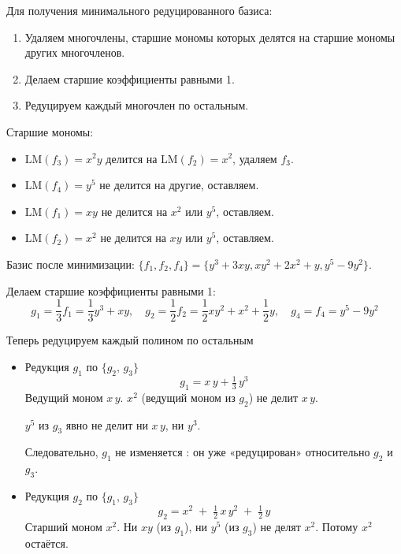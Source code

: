 \documentclass[a4paper]{article}
\begin{document}
\begin{enumerate}
  Для получения минимального редуцированного базиса:
  \begin{enumerate}
    \item Удаляем многочлены, старшие мономы которых делятся на старшие мономы других многочленов.
    \item Делаем старшие коэффициенты равными 1.
    \item Редуцируем каждый многочлен по остальным.
  \end{enumerate}

  
  Старшие мономы:
  \begin{itemize}
    \item $\text{LM}(f_3) = x^2y$ делится на $\text{LM}(f_2) = x^2$, удаляем $f_3$.
    \item $\text{LM}(f_4) = y^5$ не делится на другие, оставляем.
    \item $\text{LM}(f_1) = xy$ не делится на $x^2$ или $y^5$, оставляем.
    \item $\text{LM}(f_2) = x^2$ не делится на $xy$ или $y^5$, оставляем.
  \end{itemize}
  
  Базис после минимизации: \( \{f_1, f_2, f_4\} = \{y^3 + 3xy,  xy^2 + 2x^2 + y,  y^5 - 9y^2\} \).

  Делаем старшие коэффициенты равными 1:
  \[
  g_1 = \frac{1}{3} f_1 = \frac{1}{3} y^3 + xy, \quad g_2 = \frac{1}{2} f_2 =
   \frac{1}{2} xy^2 + x^2 + \frac{1}{2} y, \quad g_4 = f_4 = y^5 - 9y^2
  \]

  Теперь редуцируем каждый полином по остальным
  \begin{itemize}
    \item 
    Редукция $g_1$ по $\{g_2,\,g_3\}$
  $$
  g_1 = x\,y + \tfrac{1}{3}\,y^3
  $$
  Ведущий моном $x\,y$. $x^2$ (ведущий моном из $g_2$) не делит $x\,y$.
  
  $y^5$ из $g_3$ явно не делит ни $x\,y$, ни $y^3$.
  
  Следовательно, $g_1$  не изменяется : он уже «редуцирован» относительно
   $g_2$ и $g_3$.
  
  \item Редукция $g_2$ по $\{g_1,\,g_3\}$
  $$
  g_2 = x^2 \;+\; \tfrac12\,x\,y^2 \;+\; \tfrac12\,y
  $$
  Старший моном $x^2$. Ни $xy$ (из $g_1$), ни $y^5$ (из $g_3$) не делят $x^2$.
   Потому $x^2$ остаётся.
  

\end{itemize}
\end{enumerate}
\end{document}
